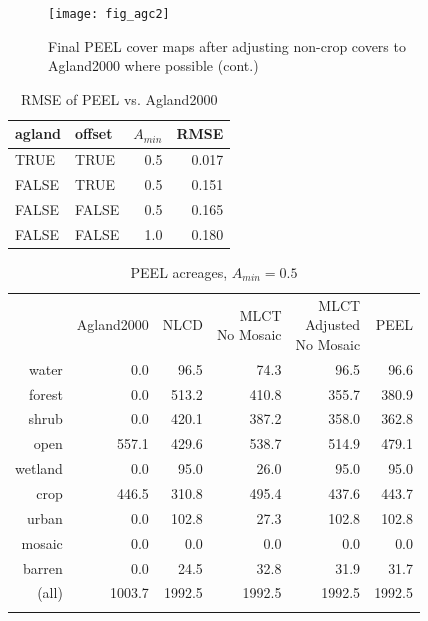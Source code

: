 \begin{figure}[ht] 
  \centering


\texttt{[image: fig\_agc2]}
\caption{Final PEEL cover maps after adjusting non-crop covers to Agland2000 where possible (cont.)} 
\label{fig:agc2} 
\end{figure} 




\begin{table}[ht]
\begin{center}
\begin{tabular}{llrr}
  \hline
agland & offset & $A_{min}$ & RMSE \\ 
  \hline
TRUE & TRUE & 0.5 & 0.017 \\ 
  FALSE & TRUE & 0.5 & 0.151 \\ 
  FALSE & FALSE & 0.5 & 0.165 \\ 
  FALSE & FALSE & 1.0 & 0.180 \\ 
   \hline
\end{tabular}
\caption{RMSE of PEEL vs. Agland2000}
\label{tab:rmse3}
\end{center}
\end{table}
\begin{table}[ht]
\begin{center}
{\small
\begin{tabular}{rrrrrr}
  \hline
 & Agland2000 & NLCD & \pbox[c][][c]{3in}{MLCT\\No Mosaic} & \pbox[c][][c]{3in}{\smallskip{}MLCT\\Adjusted\\No Mosaic} & PEEL \\ 
  \noalign{\smallskip} \hline
water & 0.0 & 96.5 & 74.3 & 96.5 & 96.6 \\ 
  forest & 0.0 & 513.2 & 410.8 & 355.7 & 380.9 \\ 
  shrub & 0.0 & 420.1 & 387.2 & 358.0 & 362.8 \\ 
  open & 557.1 & 429.6 & 538.7 & 514.9 & 479.1 \\ 
  wetland & 0.0 & 95.0 & 26.0 & 95.0 & 95.0 \\ 
  crop & 446.5 & 310.8 & 495.4 & 437.6 & 443.7 \\ 
  urban & 0.0 & 102.8 & 27.3 & 102.8 & 102.8 \\ 
  mosaic & 0.0 & 0.0 & 0.0 & 0.0 & 0.0 \\ 
  barren & 0.0 & 24.5 & 32.8 & 31.9 & 31.7 \\ 
  (all) & 1003.7 & 1992.5 & 1992.5 & 1992.5 & 1992.5 \\ 
   \noalign{\smallskip} \hline
\end{tabular}
}
\caption{PEEL acreages, $A_{min}=0.5$}
\label{tab:areas3}
\end{center}
\end{table}
 

